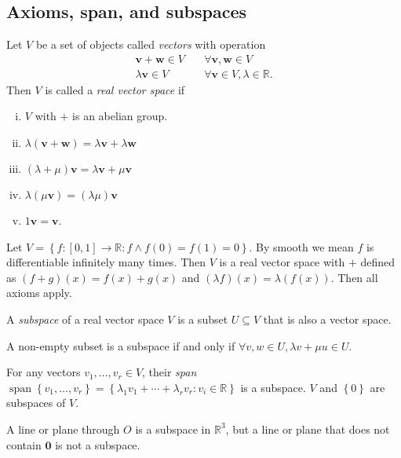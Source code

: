 \documentclass[10pt]{article}
\DeclareMathOperator{\spn}{span}
\begin{document}
    \subsection{Axioms, span, and subspaces}
    \begin{definition}
        Let $V$ be a set of objects called \textit{vectors} with operation
        \[
            \begin{aligned}
                 \mathbf{v}+\mathbf{w}\in V&\quad \forall \mathbf{v},\mathbf{w}\in V\\
                 \lambda \mathbf{v}\in V&\quad \forall \mathbf{v}\in V, \lambda\in \mathbb{R}.
            \end{aligned}
        \]
        Then $V$ is called a \textit{real vector space} if 
        \begin{enumerate}[(i).]
            \item $V$ with $+$ is an abelian group.
            \item $ \lambda(\mathbf{v}+\mathbf{w})=\lambda \mathbf{v}+\lambda \mathbf{w} $
            \item $ (\lambda+\mu)\mathbf{v}=\lambda \mathbf{v}+\mu \mathbf{v} $
            \item $ \lambda(\mu \mathbf{v})=(\lambda \mu) \mathbf{v} $
            \item $ 1 \mathbf{v}=\mathbf{v} $.
        \end{enumerate}
    \end{definition}
    \begin{example}
        Let $ V=\left\{ f:[0,1] \to \mathbb{R} : f \land f(0)=f(1)=0\right\} $. By smooth we mean $f$ is differentiable infinitely many times. Then $V$ is a real vector space with $+$ defined as $ (f+g)(x)=f(x)+g(x) $ and $ (\lambda f)(x)=\lambda(f(x)) $. Then all axioms apply.
    \end{example}
    \begin{definition}
        A \textit{subspace} of a real vector space $V$ is a subset $U \subseteq V$ that is also a vector space. 
    \end{definition}
    \begin{remark}
        A non-empty subset is a subspace if and only if $ \forall v,w\in U, \lambda v+ \mu u\in U $.
    \end{remark}
    For any vectors $ v_1,\dots,v_r\in V $, their \textit{span} $ \spn\left\{ v_1,\dots,v_r\right\}=\left\{ \lambda_1 v_1+\cdots+\lambda_r v_r:v_i\in \mathbb{R} \right\} $ is a subspace. $V$ and $ \left\{ 0\right\} $ are subspaces of $V$.
    \begin{example}
        A line or plane through $O$ is a subspace in $ \mathbb{R}^3 $, but a line or plane that does not contain $ \mathbf{0} $ is not a subspace.
    \end{example}
\end{document}
